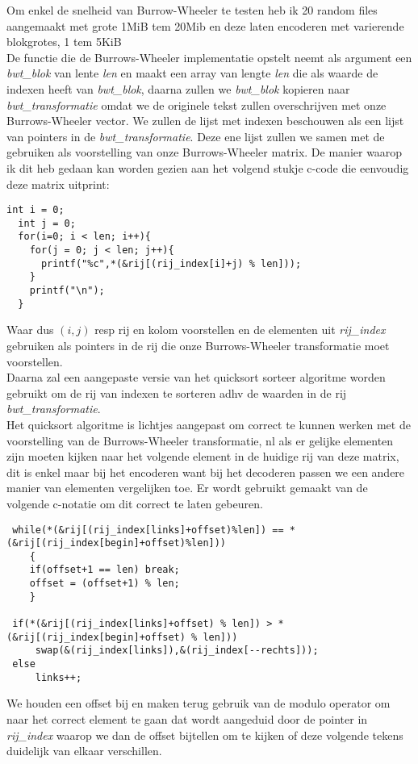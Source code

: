 \documentclass[10pt,a4paper]{report}
\begin{document}
Om enkel de snelheid van Burrow-Wheeler te testen heb ik 20 random files aangemaakt met grote 1MiB tem 20Mib en deze laten encoderen met varierende blokgrotes, 1 tem 5KiB\\

De functie die de Burrows-Wheeler implementatie opstelt neemt als argument een \emph{bwt\_blok} van lente \emph{len} en maakt een array van lengte \emph{len} die als waarde de indexen heeft van \emph{bwt\_blok}, daarna zullen we \emph{bwt\_blok} kopieren naar \emph{bwt\_transformatie} omdat we de originele tekst zullen overschrijven met onze Burrows-Wheeler vector. We zullen de lijst met indexen beschouwen als een lijst van pointers in de \emph{bwt\_transformatie}. Deze ene lijst zullen we samen met de gebruiken als voorstelling van onze Burrows-Wheeler matrix. De manier waarop ik dit heb gedaan kan worden gezien aan het volgend stukje c-code die eenvoudig deze matrix uitprint:

\begin{lstlisting}
int i = 0;
  int j = 0;
  for(i=0; i < len; i++){
    for(j = 0; j < len; j++){
      printf("%c",*(&rij[(rij_index[i]+j) % len]));
    }
    printf("\n");
  }
\end{lstlisting}
Waar dus $(i,j)$ resp rij en kolom voorstellen en de elementen uit \emph{rij\_index} gebruiken als pointers in de rij die onze Burrows-Wheeler transformatie moet voorstellen. \\

Daarna zal een aangepaste versie van het quicksort sorteer algoritme worden gebruikt om de rij van indexen te sorteren adhv de waarden in de rij \emph{bwt\_transformatie}.\\

Het quicksort algoritme is lichtjes aangepast om correct te kunnen werken met de voorstelling van de Burrows-Wheeler transformatie, nl als er gelijke elementen zijn moeten kijken naar het volgende element in de huidige rij van deze matrix, dit is enkel maar bij het encoderen want bij het decoderen passen we een andere manier van elementen vergelijken toe. Er wordt gebruikt gemaakt van de volgende c-notatie om dit correct te laten gebeuren. 
\begin{lstlisting}
 while(*(&rij[(rij_index[links]+offset)%len]) == *(&rij[(rij_index[begin]+offset)%len]))
    {
    if(offset+1 == len) break;  
    offset = (offset+1) % len;
    }
	 
 if(*(&rij[(rij_index[links]+offset) % len]) > *(&rij[(rij_index[begin]+offset) % len]))
	 swap(&(rij_index[links]),&(rij_index[--rechts]));
 else
	 links++;	 
\end{lstlisting}
We houden een offset bij en maken terug gebruik van de modulo operator om naar het correct element te gaan dat wordt aangeduid door de pointer in \emph{rij\_index} waarop we dan de offset bijtellen om te kijken of deze volgende tekens duidelijk van elkaar verschillen.\\
\end{document}
